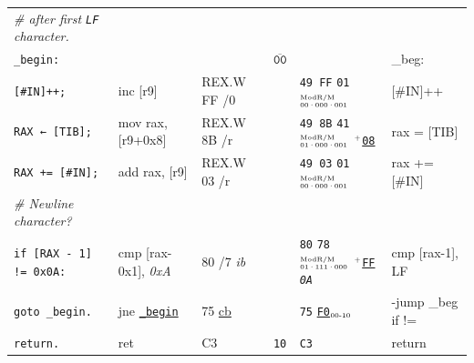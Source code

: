 \documentclass[a4paper,12pt,final]{article}
\begin{document}
\begin{table}[!htbp]
\begin{adjustwidth}{-1cm}{-1cm}
\begin{center}
\begin{tabular}{l|ll|l|lH}
\hspace{1em} \emph{\# after first \texttt{LF} character.} &  &  &  &  & \\[0pt]
\texttt{\_begin:} &  &  & \(\overline{\texttt{00}}\) &  & \_beg:\\[0pt]
\hspace{1em} \texttt{[\#IN]++;} & inc [r9] & REX.W FF /0 &  & \texttt{49 FF} \texttt{01}​\(^{\text{\tiny ModR/M}}_{\text{\tiny 00·000·001}}\) & [\#IN]++\\[0pt]
\hspace{1em} \texttt{RAX ← [TIB];} & mov rax, [r9+0x8] & REX.W 8B /r &  & \texttt{49 8B} \texttt{41}​\(^{\text{\tiny ModR/M}}_{\text{\tiny 01·000·001}}\) \(^{\text{\tiny +}}\)​\uline{\texttt{08}} & rax = [TIB]\\[0pt]
\hspace{1em} \texttt{RAX += [\#IN];} & add rax, [r9] & REX.W 03 /r &  & \texttt{49 03} \texttt{01}​\(^{\text{\tiny ModR/M}}_{\text{\tiny 00·000·001}}\) & rax += [\#IN]\\[0pt]
\hspace{1em} \emph{\# Newline character?} &  &  &  &  & \\[0pt]
\hspace{1em} \texttt{if [RAX - 1] != 0x0A:} & cmp [rax-0x1], \emph{0xA} & 80 /​7 \emph{ib} &  & \texttt{80} \texttt{78}​\(^{\text{\tiny ModR/M}}_{\text{\tiny 01·111·000}}\) \(^{\text{\tiny +}}\)​\uline{\texttt{FF}} \emph{\texttt{0A}} & cmp [rax-1], LF\\[0pt]
\hspace{2em}   \texttt{goto \_begin.} & jne \uline{\texttt{\_begin}} & 75 \uline{cb} &  & \texttt{75} \uline{\texttt{F0}}​\(_{\text{\tiny 00-10}}\) & -jump \_beg if !=\\[0pt]
\hspace{1em} \texttt{return.} & ret & C3 & \texttt{10} & \texttt{C3} & return\\[0pt]
\end{tabular}

\end{center}
\normalsize \end{adjustwidth} \end{table} \vspace{0}
\end{document}
